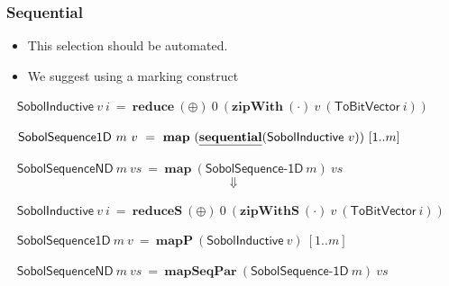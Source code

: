 \documentclass{beamer}
\begin{document}
\begin{frame}
  \frametitle{Sequential}

  \begin{itemize}
  \item This selection should be automated.
  \item We suggest using a marking construct
  \end{itemize}
\vspace{4mm}\pause

  ~\vspace{2mm}
  $\mathsf{SobolInductive}~v~i~=~\textbf{reduce}~(\oplus)~0~(\textbf{zipWith}~(\cdot)~v~(\textsf{ToBitVector}~i))$
  
  ~\vspace{2mm}
  $\mathsf{SobolSequence1D}~m~v~=~\textbf{map}~(\textbf{\underline{sequential}} (\textsf{SobolInductive}~v))~[1..m]$
  
  ~\vspace{2mm}
  $\mathsf{SobolSequenceND}~m~vs~=~\textbf{map}~(\textsf{SobolSequence-1D}~m)~vs$
  \pause
  $$\Downarrow$$

  ~\vspace{2mm}
  $\mathsf{SobolInductive}~v~i~=~\textbf{reduceS}~(\oplus)~0~(\textbf{zipWithS}~(\cdot)~v~(\textsf{ToBitVector}~i))$
  
  ~\vspace{2mm}
  $\mathsf{SobolSequence1D}~m~v~=~\textbf{mapP}~(\textsf{SobolInductive}~v)~[1..m]$
  
  ~\vspace{2mm}
  $\mathsf{SobolSequenceND}~m~vs~=~\textbf{mapSeqPar}~(\textsf{SobolSequence-1D}~m)~vs$





\end{frame}
\end{document}
